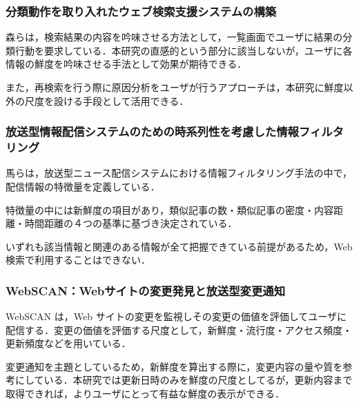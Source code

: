 \subsubsection{分類動作を取り入れたウェブ検索支援システムの構築}

森\cite{classify}らは，検索結果の内容を吟味させる方法として，一覧画面でユーザに結果の分類行動を要求している．本研究の直感的という部分に該当しないが，ユーザに各情報の鮮度を吟味させる手法として効果が期待できる．

また，再検索を行う際に原因分析をユーザが行うアプローチは，本研究に鮮度以外の尺度を設ける手段として活用できる．

\subsubsection{放送型情報配信システムのための時系列性を考慮した情報フィルタリング}

馬\cite{filtersystem}らは，放送型ニュース配信システムにおける情報フィルタリング手法の中で，配信情報の特徴量を定義している．

特徴量の中には新鮮度の項目があり，類似記事の数・類似記事の密度・内容距離・時間距離の４つの基準に基づき決定されている．

いずれも該当情報と関連のある情報が全て把握できている前提があるため，Web 検索で利用することはできない．

\subsubsection{WebSCAN：Webサイトの変更発見と放送型変更通知}

WebSCAN\cite{webscan} は，Web サイトの変更を監視しその変更の価値を評価してユーザに配信する．変更の価値を評価する尺度として，新鮮度・流行度・アクセス頻度・更新頻度などを用いている．

変更通知を主題としているため，新鮮度を算出する際に，変更内容の量や質を参考にしている．本研究では更新日時のみを鮮度の尺度としてるが，更新内容まで取得できれば，よりユーザにとって有益な鮮度の表示ができる．

